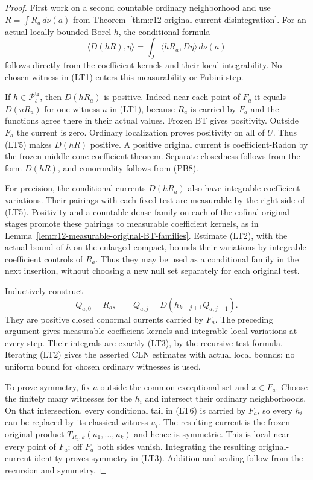 \documentclass[11pt,a4paper]{article}
\numberwithin{equation}{section}
\theoremstyle{definition}
\theoremstyle{remark}
\begin{document}
\begin{proof}
First work on a second countable ordinary neighborhood and use
$R=\int R_a\,d\nu(a)$ from
Theorem~\ref{thm:r12-original-current-disintegration}. For an actual
locally bounded Borel $h$, the conditional formula
\[
       \langle D(hR),\eta\rangle
           =\int_J\langle hR_a,D\eta\rangle\,d\nu(a)                \tag{LT5}
\]
follows directly from the coefficient kernels and their local
integrability. No chosen witness in (LT1) enters this measurability
or Fubini step.

If $h\in\mathcal P_s^{\mathrm{tr}}$, then $D(hR_a)$ is positive.
Indeed near each point of $F_a$ it equals $D(uR_a)$ for one witness
$u$ in (LT1), because $R_a$ is carried by $F_a$ and the functions
agree there in their actual values. Frozen BT gives positivity.
Outside $F_a$ the current is zero. Ordinary localization proves
positivity on all of $U$. Thus (LT5) makes $D(hR)$ positive. A
positive original current is coefficient-Radon by the frozen
middle-cone coefficient theorem. Separate closedness follows from
the form $D(hR)$, and conormality follows from (PB8).

For precision, the conditional currents $D(hR_a)$ also have
integrable coefficient variations. Their pairings with each
fixed test are measurable by the right side of (LT5). Positivity
and a countable dense family on each of the cofinal original
stages promote these pairings to measurable coefficient kernels,
as in Lemma~\ref{lem:r12-measurable-original-BT-families}.
Estimate (LT2), with the actual bound of $h$ on the enlarged
compact, bounds their variations by integrable coefficient
controls of $R_a$. Thus they may be used as a conditional family
in the next insertion, without choosing a new null set separately
for each original test.

Inductively construct
\[
      Q_{a,0}=R_a,\qquad
      Q_{a,j}=D(h_{k-j+1}Q_{a,j-1}).
                                                                    \tag{LT6}
\]
They are positive closed conormal currents carried by $F_a$.
The preceding argument gives measurable coefficient kernels and
integrable local variations at every step. Their integrals are
exactly (LT3), by the recursive test formula. Iterating (LT2)
gives the asserted CLN estimates with actual local bounds; no
uniform bound for chosen ordinary witnesses is used.

To prove symmetry, fix $a$ outside the common exceptional set and
$x\in F_a$. Choose the finitely many witnesses for the $h_i$ and
intersect their ordinary neighborhoods. On that intersection,
every conditional tail in (LT6) is carried by $F_a$, so every
$h_i$ can be replaced by its classical witness $u_i$. The resulting
current is the frozen original product
$T_{R_a,k}(u_1,\ldots,u_k)$ and hence is symmetric. This is local
near every point of $F_a$; off $F_a$ both sides vanish. Integrating
the resulting original-current identity proves symmetry in (LT3).
Addition and scaling follow from the recursion and symmetry.


\end{proof}
\end{document}
